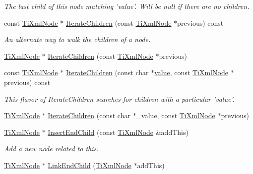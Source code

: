 \begin{DoxyCompactItemize}
\begin{DoxyCompactList}\small\item\em The last child of this node matching 'value'. Will be null if there are no children. \item\end{DoxyCompactList}\item 
const \hyperlink{classTiXmlNode}{TiXmlNode} $\ast$ \hyperlink{classTiXmlNode_aaef7ac3978c4bb1cc8a24ffae7bced75}{IterateChildren} (const \hyperlink{classTiXmlNode}{TiXmlNode} $\ast$previous) const 
\begin{DoxyCompactList}\small\item\em An alternate way to walk the children of a node. \item\end{DoxyCompactList}\item 
\hyperlink{classTiXmlNode}{TiXmlNode} $\ast$ \hyperlink{classTiXmlNode_a2358e747118fdbf0e467b1e4f7d03de1}{IterateChildren} (const \hyperlink{classTiXmlNode}{TiXmlNode} $\ast$previous)
\item 
const \hyperlink{classTiXmlNode}{TiXmlNode} $\ast$ \hyperlink{classTiXmlNode_af2b86dbe25d3d26fa48180edc5e2a9fc}{IterateChildren} (const char $\ast$\hyperlink{classTiXmlNode_aead528b3cedc33c16a6c539872c7cc8b}{value}, const \hyperlink{classTiXmlNode}{TiXmlNode} $\ast$previous) const 
\begin{DoxyCompactList}\small\item\em This flavor of IterateChildren searches for children with a particular 'value'. \item\end{DoxyCompactList}\item 
\hyperlink{classTiXmlNode}{TiXmlNode} $\ast$ \hyperlink{classTiXmlNode_a67ba8275e533e6f76340236c42ea0aea}{IterateChildren} (const char $\ast$\_\-value, const \hyperlink{classTiXmlNode}{TiXmlNode} $\ast$previous)
\item 
\hyperlink{classTiXmlNode}{TiXmlNode} $\ast$ \hyperlink{classTiXmlNode_af287a913ce46d8dbf7ef24fec69bbaf0}{InsertEndChild} (const \hyperlink{classTiXmlNode}{TiXmlNode} \&addThis)
\begin{DoxyCompactList}\small\item\em Add a new node related to this. \item\end{DoxyCompactList}\item 
\hyperlink{classTiXmlNode}{TiXmlNode} $\ast$ \hyperlink{classTiXmlNode_a1a881212554b759865f6cac79a851d38}{LinkEndChild} (\hyperlink{classTiXmlNode}{TiXmlNode} $\ast$addThis)

\end{DoxyCompactItemize}
